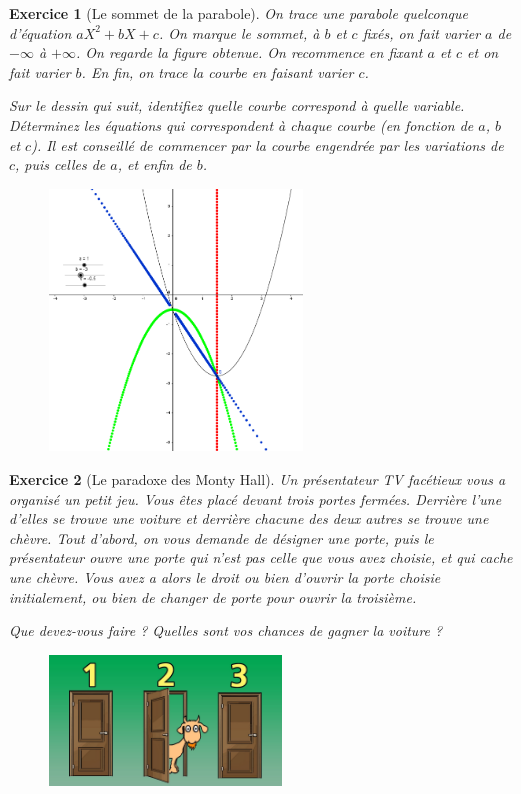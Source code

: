 \documentclass[12pt]{article}
\theoremstyle{break}
\newtheorem{exo}{Exercice}
\begin{document}
\begin{exo}[Le sommet de la parabole]
On trace une parabole quelconque d'équation $aX^2+bX+c$. On marque le sommet, à $b$ et $c$ fixés, on fait varier $a$ de $-\infty$ à $+\infty$. On regarde la figure obtenue. On recommence en fixant $a$ et $c$ et on fait varier $b$. En fin, on trace la courbe en faisant varier $c$.

Sur le dessin qui suit, identifiez quelle courbe correspond à quelle variable. Déterminez les équations qui correspondent à chaque courbe (en fonction de $a$, $b$ et $c$). Il est conseillé de commencer par la courbe engendrée par les variations de $c$, puis celles de $a$, et enfin de $b$.

\begin{figure}[h!]
	\centering
    \includegraphics[width=0.6\textwidth]{SommetParabole.png}

\end{figure}
\end{exo}


\begin{exo}[Le paradoxe des Monty Hall]
Un présentateur TV facétieux vous a organisé un petit jeu. Vous êtes placé devant trois portes fermées. Derrière l'une d'elles se trouve une voiture et derrière chacune des deux autres se trouve une chèvre. Tout d'abord, on vous demande de désigner une porte, puis le présentateur ouvre une porte qui n'est pas celle que vous avez choisie, et qui cache une chèvre. Vous avez a alors le droit ou bien d'ouvrir la porte choisie initialement, ou bien de changer de porte pour ouvrir la troisième.

Que devez-vous faire ? Quelles sont vos chances de gagner la voiture ?

\begin{figure}[!ht]
	\centering
    \includegraphics[width=0.55\textwidth]{MontyHall.jpg}

\end{figure}
\end{exo}
\end{document}
